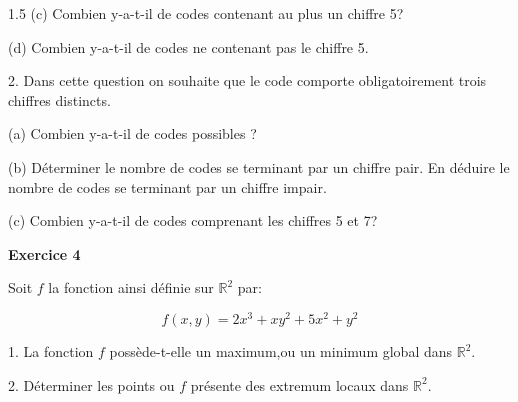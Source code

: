 \documentclass[12pt]{article}
\begin{document}
\begin{spacing}{1.5}
 (c) Combien y-a-t-il de codes contenant au plus un chiffre 5?
 
 (d) Combien y-a-t-il de codes ne contenant pas le chiffre 5.
 
 2. Dans cette question on souhaite que le code comporte obligatoirement trois chiffres distincts.
 
 (a) Combien y-a-t-il de codes possibles ?
 
 (b) Déterminer le nombre de codes se terminant par un chiffre pair. En déduire le nombre de codes se terminant par un chiffre impair.
 
 (c) Combien y-a-t-il de codes comprenant les chiffres 5 et 7?
 
 \medskip\textbf{Exercice 4}

 Soit $f$ la fonction ainsi définie sur $\mathbb{R}^2$ par:
 
 \[f(x,y)=2x^3+xy^2+5x^2+y^2\]
 
 1. La fonction $f$ possède-t-elle un maximum,ou un minimum global dans $\mathbb{R}^2$.
 
 2. Déterminer les points ou $f$ présente des extremum locaux dans $\mathbb{R}^2$.
 
 
 \quad

\end{spacing}
\end{document}
